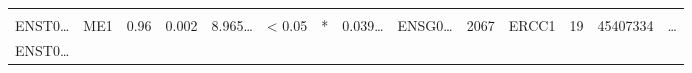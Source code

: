 \documentclass[
]{article}
\begin{document}
\begin{longtable}[]{@{}llllllllllllll@{}}
\begin{minipage}[t]{0.02\columnwidth}
\end{minipage}\tabularnewline
\begin{minipage}[t]{0.05\columnwidth}\raggedright
ENST0\ldots{}\strut
\end{minipage} & \begin{minipage}[t]{0.04\columnwidth}\raggedright
ME1\strut
\end{minipage} & \begin{minipage}[t]{0.04\columnwidth}\raggedright
0.96\strut
\end{minipage} & \begin{minipage}[t]{0.04\columnwidth}\raggedright
0.002\strut
\end{minipage} & \begin{minipage}[t]{0.05\columnwidth}\raggedright
8.965\ldots{}\strut
\end{minipage} & \begin{minipage}[t]{0.05\columnwidth}\raggedright
\textless{} 0.05\strut
\end{minipage} & \begin{minipage}[t]{0.03\columnwidth}\raggedright
*\strut
\end{minipage} & \begin{minipage}[t]{0.05\columnwidth}\raggedright
0.039\ldots{}\strut
\end{minipage} & \begin{minipage}[t]{0.05\columnwidth}\raggedright
ENSG0\ldots{}\strut
\end{minipage} & \begin{minipage}[t]{0.05\columnwidth}\raggedright
2067\strut
\end{minipage} & \begin{minipage}[t]{0.05\columnwidth}\raggedright
ERCC1\strut
\end{minipage} & \begin{minipage}[t]{0.05\columnwidth}\raggedright
19\strut
\end{minipage} & \begin{minipage}[t]{0.05\columnwidth}\raggedright
45407334\strut
\end{minipage} & \begin{minipage}[t]{0.02\columnwidth}\raggedright
\ldots{}\strut
\end{minipage}\tabularnewline
\begin{minipage}[t]{0.05\columnwidth}\raggedright
ENST0\ldots{}\strut
\end{minipage} & \begin{minipage}[t]{0.04\columnwidth}\raggedright

\end{minipage}
\end{longtable}
\end{document}
